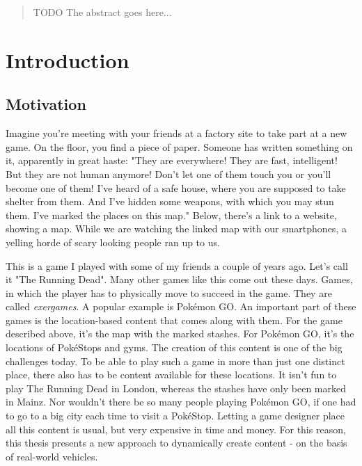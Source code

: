 \begin{abstract}
TODO The abstract goes here...
\end{abstract}



\chapter{Introduction}
\section{Motivation}
Imagine you're meeting with your friends at a factory site to take part at a new game. On the floor, you find a piece of paper. Someone has written something on it, apparently in great haste: "They are everywhere! They are fast, intelligent! But they are not human anymore! Don't let one of them touch you or you'll become one of them! I've heard of a safe house, where you are supposed to take shelter from them. And I've hidden some weapons, with which you may stun them. I've marked the places on this map." Below, there's a link to a website, showing a map. While we are watching the linked map with our smartphones, a yelling horde of scary looking people ran up to us.
 
This is a game I played with some of my friends a couple of years ago. Let's call it "The Running Dead". Many other games like this come out these days. Games, in which the player has to physically move to succeed in the game. They are called \emph{exergames}. A popular example is Pok\'{e}mon GO. An important part of these games is the location-based content that comes along with them. For the game described above, it's the map with the marked stashes. For Pok\'{e}mon GO, it's the locations of Pok\'{e}Stops and gyms. The creation of this content is one of the big challenges today. To be able to play such a game in more than just one distinct place, there also has to be content available for these locations. It isn't fun to play The Running Dead in London, whereas the stashes have only been marked in Mainz. Nor wouldn't there be so many people playing Pok\'{e}mon GO, if one had to go to a big city each time to visit a Pok\'{e}Stop. Letting a game designer place all this content is usual, but very expensive in time and money. For this reason, this thesis presents a new approach to dynamically create content - on the basis of real-world vehicles.

